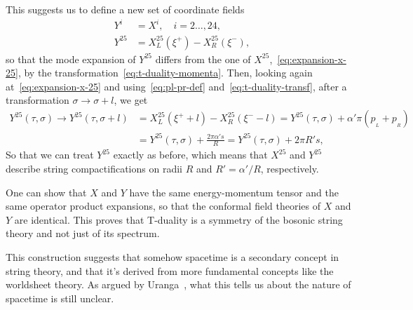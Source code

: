 This suggests us to define a new set of coordinate fields
\begin{equation}\label{eq:t-duality-string-transf}
\begin{aligned}
    Y^i &= X^i, \quad i = 2 \dots, 24, \\
    Y^{25} &= X^{25}_L(\xi^+) - X^{25}_R(\xi^-) ,
\end{aligned}
\end{equation}
so that the mode expansion of $Y^{25}$ differs from the one of $X^{25}$,~\eqref{eq:expansion-x-25}, by the transformation~\eqref{eq:t-duality-momenta}. Then, looking again at~\eqref{eq:expansion-x-25} and using~\eqref{eq:pl-pr-def} and~\eqref{eq:t-duality-transf}, after a transformation $\sigma \to \sigma + l$, we get
\begin{equation}
\begin{aligned}
    Y^{25}(\tau, \sigma) \to Y^{25}(\tau, \sigma + l) &= X^{25}_L (\xi^+ + l) - X^{25}_R(\xi^- - l) = Y^{25}(\tau,\sigma) + \alpha' \pi (p_{\!_L} + p_{\!_R}) \\
    &= Y^{25}(\tau,\sigma) + \frac{2\pi\alpha' s}{R} = Y^{25}(\tau,\sigma) + 2\pi R' s ,
\end{aligned}
\end{equation}
So that we can treat $Y^{25}$ exactly as before, which means that $X^{25}$ and $Y^{25}$ describe string compactifications on radii $R$ and $R' = \alpha'/R$, respectively.

One can show that $X$ and $Y$ have the same energy-momentum tensor and the same operator product expansions, so that the conformal field theories of $X$ and $Y$ are identical. This proves that T-duality is a symmetry of the bosonic string theory and not just of its spectrum.

This construction suggests that somehow spacetime is a secondary concept in string theory, and that it's derived from more fundamental concepts like the worldsheet theory. As argued by Uranga~\cite{uranga:strings}, what this tells us about the nature of spacetime is still unclear.